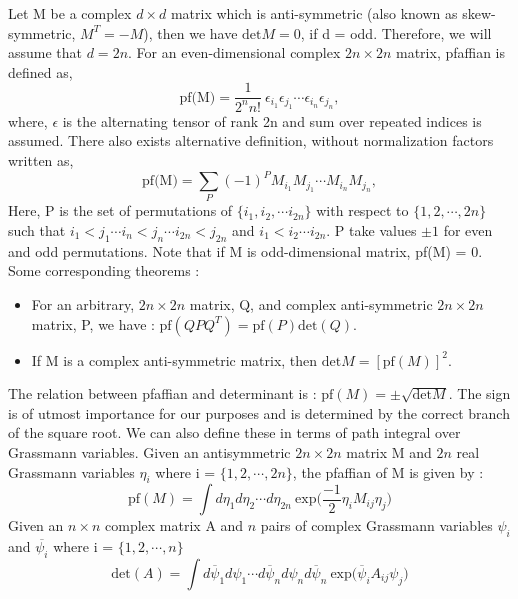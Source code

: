 Let M be a complex $d \times d$ matrix which is anti-symmetric (also known as skew-symmetric, $M^{T} = -M$), then we have $\text{det}M = 0$, if d = odd. Therefore, we will assume that $d = 2n$. 
For an even-dimensional complex $ 2n \times 2n$ matrix, pfaffian is defined as, 
\begin{equation}
\text{pf(M)} = \frac{1}{2^n n!} ~ \epsilon_{i_{1}}\epsilon_{j_{1}} \cdots \epsilon_{i_{n}}\epsilon_{j_{n}}, 
\end{equation}
where, $\epsilon$ is the alternating tensor of rank 2n and sum over 
repeated indices is assumed. There also exists alternative definition, 
without normalization factors written as, 
\begin{equation}
\text{pf(M)} = \sum_{P} (-1)^{P}  M_{i_{1}}M_{j_{1}} \cdots M_{i_{n}}M_{j_{n}}, 
\end{equation}
Here, P is the set of permutations of $\{i_{1}, i_{2}, \cdots i_{2n}\}$ with respect to  $\{1, 2, \cdots, 2n\}$ such 
that $ i_{1} < j_{1} \cdots i_{n} < j_{n} \cdots i_{2n} < j_{2n} $ and $ i_{1} < i_{2} \cdots i_{2n}$. P take values 
$\pm 1$ for even and odd permutations. Note that if M is odd-dimensional matrix, pf(M) = 0. 
Some corresponding theorems :
\begin{itemize}
\item For an arbitrary, $ 2n \times 2n$ matrix, Q, and complex anti-symmetric 
$ 2n \times 2n$ matrix, P, we have : $\text{pf}(QPQ^{T}) = \text{pf}(P) \text{det}(Q)$. 
\item If M is a complex anti-symmetric matrix, then $\text{det} M = [\text{pf}(M)]^{2}$.
\end{itemize}
The relation between pfaffian and determinant is : $\text{pf}(M) = \pm \sqrt{\text{det}M}$. The sign is of utmost importance for our purposes and is 
determined by the correct branch of the square root. 
We can also define these in terms of path integral over Grassmann variables. 
Given an antisymmetric $ 2n \times 2n$ matrix M and $2n$ real 
Grassmann variables $\eta_{i}$ where i = $\{1, 2, \cdots, 2n\}$, the pfaffian of M is given by :
\begin{equation}
\text{pf}(M) =  \int  d\eta_{1} d\eta_{2} \cdots d\eta_{2n} ~ \text{exp} \Bigg( \frac{-1}{2}\eta_{i} M_{ij} \eta_{j}\Bigg)
\end{equation}
Given an $ n \times n$ complex matrix A and $n$ pairs of complex Grassmann variables $\psi_{i}$ and $\overline{\psi_i}$ 
where i = $\{1, 2, \cdots, n\}$ 
\begin{equation}
\label{eq:det_formula}
\text{det}(A) =  \int  d\overline{\psi}_{1} d\psi_{1} \cdots d\overline{\psi}_{n} d\psi_{n} d\overline{\psi}_{n} ~ \text{exp}  \Big( \overline{\psi}_{i} A_{ij} \psi_{j}\Big)
\end{equation}
